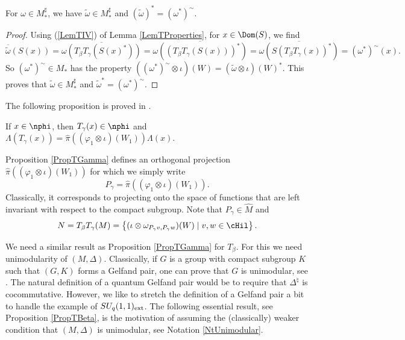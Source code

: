 \begin{prop}\label{PropSharpTilde}
 For $\omega \in M_\ast^\sharp$, we have $\tilde{\omega} \in M_\ast^\sharp$ and $(\tilde{\omega})^\ast = (\omega^\ast)^{\sim}$.
\end{prop}
\begin{proof}
Using (\ref{LemTIV}) of Lemma \ref{LemTProperties}, for $x \in \Dom(S)$, we f\/ind
\[
 \overline{\tilde{\omega}}(S(x)) = \overline{\omega(T_\beta T_\gamma (S(x)^\ast))} = \overline{\omega((T_\beta T_\gamma (S(x)))^\ast)} = \overline{ \omega(S(T_\beta T_\gamma(x))^\ast)} = (\omega^\ast)^\sim(x).
\]
So $(\omega^\ast)^\sim \in M_\ast$ has the property $((\omega^\ast)^\sim \otimes \iota)(W) = (\tilde{\omega}  \otimes \iota)(W)^\ast$. This proves that $\tilde{\omega} \in M_\ast^\sharp$ and $\tilde{\omega}^\ast = (\omega^\ast)^\sim$.
\end{proof}

The following proposition is proved in \cite[Proposition 3.1]{VaeVaiExt}.

\begin{prop}\label{PropTGamma}
If $x \in \nphi$, then $T_\gamma (x) \in \nphi$ and $\Lambda(T_\gamma(x)) = \hat{\pi}((\varphi_1 \otimes \iota)(W_1)) \Lambda(x)$.
\end{prop}

Proposition \ref{PropTGamma} def\/ines an orthogonal projection $\hat{\pi}((\varphi_1 \otimes \iota)(W_1))$ for which we simply write
\[
P_\gamma = \hat{\pi}((\varphi_1 \otimes \iota)(W_1)).
\]
 Classically, it corresponds to projecting onto the space of functions that are left invariant with respect to the compact subgroup. Note that $P_\gamma \in \hat{M}$ and
\[
N = T_\beta T_\gamma(M) = \left\{ (\iota \otimes \omega_{P_\gamma v, P_\gamma w})(W) \mid v,w \in \cHil \right\}.
\]

We need a similar result as Proposition \ref{PropTGamma} for $T_\beta$. For this we need unimodularity of $(M, \Delta)$. Classically, if $G$ is a group with compact subgroup $K$ such that $(G, K)$ forms a Gelfand pair, one can prove that $G$ is unimodular, see \cite[Proposition~I.1]{Far}. The natural def\/inition of a quantum Gelfand pair would be to require that $\Delta^\natural$ is cocommutative. However, we like to stretch the def\/inition of a Gelfand pair a bit to handle the example of $SU_q(1,1)_{{\rm ext}}$. The following essential result, see Proposition \ref{PropTBeta}, is the motivation of assuming the (classically) weaker condition that $(M, \Delta)$ is unimodular, see Notation \ref{NtUnimodular}.

